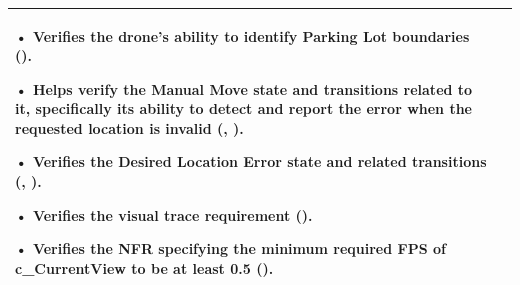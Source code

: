 \documentclass[12pt, titlepage]{article}
\begin{document}
\begin{table}[!h]
\begin{center}
\begin{tabular}{ | m{1.5cm} | m{15cm} | }
• Verifies the drone’s ability to identify Parking Lot boundaries (\nameref{GEN_001}).

• Helps verify the Manual Move state and transitions related to it, specifically its ability to detect and report the error when the requested location is invalid (\nameref{STA_002}, \nameref{TRANS_005}).

• Verifies the Desired Location Error state and related transitions (\nameref{STA_007}, \nameref{TRANS_006}). 

• Verifies the visual trace requirement (\nameref{USE_001}). 

• Verifies the NFR specifying the minimum required FPS of c\_CurrentView to be at least 0.5 (\nameref{PERF_004}).
\\ 
\hline
\end{tabular}
\end{center}
\end{table}
\end{document}
